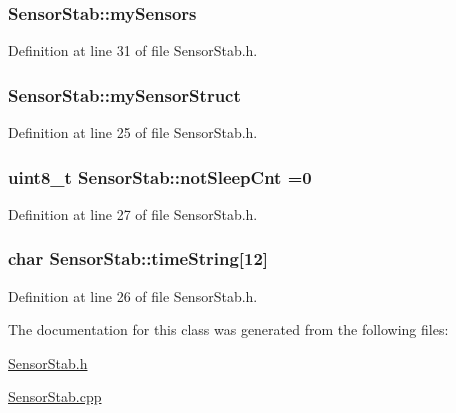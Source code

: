 \subsubsection[{\texorpdfstring{my\+Sensors}{mySensors}}]{ Sensor\+Stab\+::my\+Sensors\hspace{0.3cm}{\ttfamily [private]}}\hypertarget{class_sensor_stab_af8b2172b2218888adf62f95b4aa4b72d}{}\label{class_sensor_stab_af8b2172b2218888adf62f95b4aa4b72d}


Definition at line 31 of file Sensor\+Stab.\+h.

\subsubsection[{\texorpdfstring{my\+Sensor\+Struct}{mySensorStruct}}]{ Sensor\+Stab\+::my\+Sensor\+Struct\hspace{0.3cm}{\ttfamily [private]}}\hypertarget{class_sensor_stab_abf7a8586c865cfd3e3155392323d5b8a}{}\label{class_sensor_stab_abf7a8586c865cfd3e3155392323d5b8a}


Definition at line 25 of file Sensor\+Stab.\+h.

\subsubsection[{\texorpdfstring{not\+Sleep\+Cnt}{notSleepCnt}}]{\setlength{\rightskip}{0pt plus 5cm}uint8\+\_\+t Sensor\+Stab\+::not\+Sleep\+Cnt =0\hspace{0.3cm}{\ttfamily [private]}}\hypertarget{class_sensor_stab_accf54181552ac1003ec399401b0a61be}{}\label{class_sensor_stab_accf54181552ac1003ec399401b0a61be}


Definition at line 27 of file Sensor\+Stab.\+h.

\subsubsection[{\texorpdfstring{time\+String}{timeString}}]{\setlength{\rightskip}{0pt plus 5cm}char Sensor\+Stab\+::time\+String\mbox{[}12\mbox{]}\hspace{0.3cm}{\ttfamily [private]}}\hypertarget{class_sensor_stab_aded3f5795a5d2ded34d6f92b0fbc2f15}{}\label{class_sensor_stab_aded3f5795a5d2ded34d6f92b0fbc2f15}


Definition at line 26 of file Sensor\+Stab.\+h.



The documentation for this class was generated from the following files\+:\begin{DoxyCompactItemize}
\item 
\hyperlink{_sensor_stab_8h}{Sensor\+Stab.\+h}\item 
\hyperlink{_sensor_stab_8cpp}{Sensor\+Stab.\+cpp}\end{DoxyCompactItemize}
